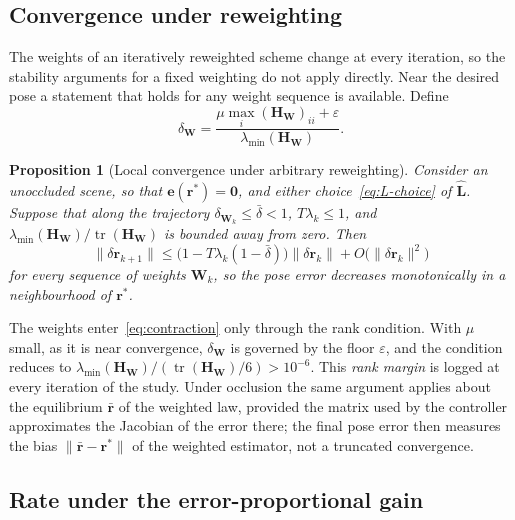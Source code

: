\documentclass[preprint,12pt]{elsarticle}
\newtheorem{proposition}{Proposition}
\theoremstyle{remark}
\newcommand{\Lh}{\widehat{\mathbf{L}}}
\newcommand{\W}{\mathbf{W}}
\newcommand{\HW}{\mathbf{H}_{\mathbf{W}}}
\newcommand{\e}{\mathbf{e}}
\newcommand{\dr}{\delta\mathbf{r}}
\newcommand{\tr}{\operatorname{tr}}
\begin{document}
\subsection{Convergence under reweighting}

The weights of an iteratively reweighted scheme change at every iteration, so
the stability arguments for a fixed weighting do not apply directly. Near the
desired pose a statement that holds for any weight sequence is available.
Define
\begin{equation}
\delta_{\W}=\frac{\mu\max_{i}(\HW)_{ii}+\varepsilon}{\lambda_{\min}(\HW)}.
\label{eq:deltaW}
\end{equation}

\begin{proposition}[Local convergence under arbitrary reweighting]
\label{prop:reweighting}
Consider an unoccluded scene, so that $\e(\mathbf{r}^{*})=\mathbf{0}$, and
either choice~\eqref{eq:L-choice} of $\Lh$. Suppose that along the
trajectory $\delta_{\W_{k}}\le\bar\delta<1$, $T\lambda_{k}\le1$, and
$\lambda_{\min}(\HW)/\tr(\HW)$ is bounded away from zero. Then
\begin{equation}
\lVert\dr_{k+1}\rVert\le\bigl(1-T\lambda_{k}(1-\bar\delta)\bigr)\lVert\dr_{k}\rVert
+O\bigl(\lVert\dr_{k}\rVert^{2}\bigr)
\label{eq:contraction}
\end{equation}
for every sequence of weights $\W_{k}$, so the pose error decreases
monotonically in a neighbourhood of $\mathbf{r}^{*}$.
\end{proposition}

The weights enter~\eqref{eq:contraction} only through the rank condition. With
$\mu$ small, as it is near convergence, $\delta_{\W}$ is governed by the floor
$\varepsilon$, and the condition reduces to
$\lambda_{\min}(\HW)/(\tr(\HW)/6)>10^{-6}$. This \emph{rank margin} is logged
at every iteration of the study. Under occlusion the same argument applies
about the equilibrium $\bar{\mathbf{r}}$ of the weighted law, provided the
matrix used by the controller approximates the Jacobian of the error there; the
final pose error then measures the bias $\lVert\bar{\mathbf{r}}-\mathbf{r}^{*}\rVert$
of the weighted estimator, not a truncated convergence.

\subsection{Rate under the error-proportional gain}
\end{document}
